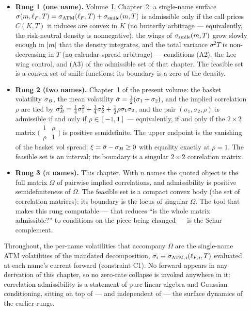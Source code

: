 \begin{itemize}
  \item \textbf{Rung 1 (one name).} Volume~I, Chapter~2: a single-name surface
        $\sigma(m,\ell_F,T) = \sigma_{\mathrm{ATM}}(\ell_F,T) + \sigma_{\mathrm{smile}}(m,T)$ is admissible only
        if the call prices $C(K,T)$ it induces are convex in $K$ (no butterfly
        arbitrage --- equivalently, the risk-neutral density is nonnegative),
        the wings of $\sigma_{\mathrm{smile}}(m,T)$ grow slowly enough in $\lvert m\rvert$
        that the density integrates, and the total variance $\sigma^2 T$ is
        non-decreasing in $T$ (no calendar-spread arbitrage) --- conditions
        (A2), the Lee wing control, and (A3) of the admissible set of that
        chapter. The feasible set is a convex set of
        smile functions; its boundary is a zero of the density.
  \item \textbf{Rung 2 (two names).} Chapter~1 of the present volume: the
        basket volatility $\sigma_B$, the mean volatility $\bar\sigma =
        \tfrac{1}{2}(\sigma_1+\sigma_2)$, and the implied correlation $\rho$
        are tied by $\sigma_B^2 = \tfrac14\sigma_1^2 + \tfrac14\sigma_2^2 +
        \tfrac12\rho\sigma_1\sigma_2$, and the pair
        $(\sigma_1,\sigma_2,\rho)$ is admissible if and only if
        $\rho \in [-1,1]$ --- equivalently, if and only if the $2\times 2$
        matrix $\bigl(\begin{smallmatrix} 1 & \rho \\ \rho & 1
        \end{smallmatrix}\bigr)$ is positive semidefinite. The upper endpoint
        is the vanishing of the basket vol spread: $\xi = \bar\sigma - \sigma_B \ge 0$
        with equality exactly at $\rho = 1$. The feasible set is an interval;
        its boundary is a singular $2\times 2$ correlation matrix.
  \item \textbf{Rung 3 ($n$ names).} This chapter. With $n$ names the quoted
        object is the full matrix $\Omega$ of pairwise implied correlations,
        and admissibility is positive semidefiniteness of $\Omega$. The
        feasible set is a compact convex body (the set of correlation
        matrices); its boundary is the locus of singular $\Omega$. The tool
        that makes this rung computable --- that reduces ``is the whole
        matrix admissible?'' to conditions on the piece being changed --- is
        the Schur complement.
\end{itemize}

Throughout, the per-name volatilities that accompany $\Omega$ are the
single-name ATM volatilities of the mandated decomposition,
$\sigma_i \equiv \sigma_{\mathrm{ATM},i}(\ell_{F,i}, T)$ evaluated at each name's current
forward (constraint C1). No forward appears in any derivation of this
chapter, so no zero-rate collapse is invoked anywhere in it: correlation
admissibility is a statement of pure linear algebra and Gaussian
conditioning, sitting on top of --- and independent of --- the surface
dynamics of the earlier rungs.

